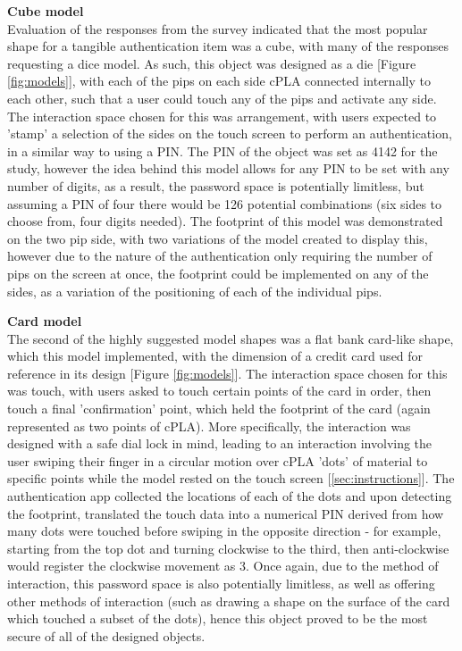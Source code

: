 \documentclass{l4proj}
\begin{document}
\textbf{Cube model}\\
Evaluation of the responses from the survey indicated that the most popular shape for a tangible authentication item was a cube, with many of the responses requesting a dice model. As such, this object was designed as a die [Figure \ref{fig:models}], with each of the pips on each side cPLA connected internally to each other, such that a user could touch any of the pips and activate any side. The interaction space chosen for this was arrangement, with users expected to 'stamp' a selection of the sides on the touch screen to perform an authentication, in a similar way to using a PIN. The PIN of the object was set as 4142 for the study, however the idea behind this model allows for any PIN to be set with any number of digits, as a result, the password space is potentially limitless, but assuming a PIN of four there would be 126 potential combinations (six sides to choose from, four digits needed). The footprint of this model was demonstrated on the two pip side, with two variations of the model created to display this, however due to the nature of the authentication only requiring the number of pips on the screen at once, the footprint could be implemented on any of the sides, as a variation of the positioning of each of the individual pips.

\textbf{Card model}\\
The second of the highly suggested model shapes was a flat bank card-like shape, which this model implemented, with the dimension of a credit card used for reference in its design [Figure \ref{fig:models}]. The interaction space chosen for this was touch, with users asked to touch certain points of the card in order, then touch a final 'confirmation' point, which held the footprint of the card (again represented as two points of cPLA). More specifically, the interaction was designed with a safe dial lock in mind, leading to an interaction involving the user swiping their finger in a circular motion over cPLA 'dots' of material to specific points while the model rested on the touch screen [\ref{sec:instructions}]. The authentication app collected the locations of each of the dots and upon detecting the footprint, translated the touch data into a numerical PIN derived from how many dots were touched before swiping in the opposite direction - for example, starting from the top dot and turning clockwise to the third, then anti-clockwise would register the clockwise movement as 3. Once again, due to the method of interaction, this password space is also potentially limitless, as well as offering other methods of interaction (such as drawing a shape on the surface of the card which touched a subset of the dots), hence this object proved to be the most secure of all of the designed objects.
\end{document}
